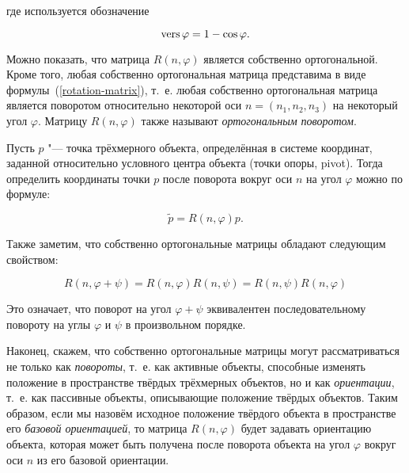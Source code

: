 \noindent где используется обозначение

$$\operatorname{vers}\varphi=1-\cos\varphi.$$

Можно показать, что матрица $R(n,\varphi)$ является собственно ортогональной. Кроме того, любая собственно ортогональная
матрица представима в виде формулы~(\ref{rotation-matrix}), т.~е. любая собственно ортогональная матрица
является поворотом относительно некоторой оси $n=(n_1,n_2,n_3)$ на некоторый угол $\varphi$. Матрицу $R(n,\varphi)$
также называют \textit{ортогональным поворотом}.

Пусть $p$ "--- точка трёхмерного объекта, определённая в системе координат, заданной относительно условного центра
объекта (точки опоры, pivot). Тогда определить координаты точки $p$ после поворота вокруг оси $n$ на угол $\varphi$
можно по формуле:

$$
\tilde p=R(n,\varphi)p.
$$

Также заметим, что собственно ортогональные матрицы обладают следующим свойством:

$$
R(n,\varphi+\psi)=R(n,\varphi)R(n,\psi)=R(n,\psi)R(n,\varphi)
$$

Это означает, что поворот на угол $\varphi+\psi$ эквивалентен последовательному повороту на углы $\varphi$ и $\psi$ в
произвольном порядке.

Наконец, скажем, что собственно ортогональные матрицы могут рассматриваться не только как \textit{повороты}, т.~е. как
активные объекты, способные изменять положение в пространстве твёрдых трёхмерных объектов, но и как
\textit{ориентации}, т.~е. как пассивные объекты, описывающие положение твёрдых объектов. Таким образом, если мы назовём
исходное положение твёрдого объекта в пространстве его \textit{базовой ориентацией}, то матрица $R(n,\varphi)$ будет
задавать ориентацию объекта, которая может быть получена после поворота объекта на угол $\varphi$ вокруг оси $n$ из его
базовой ориентации.
